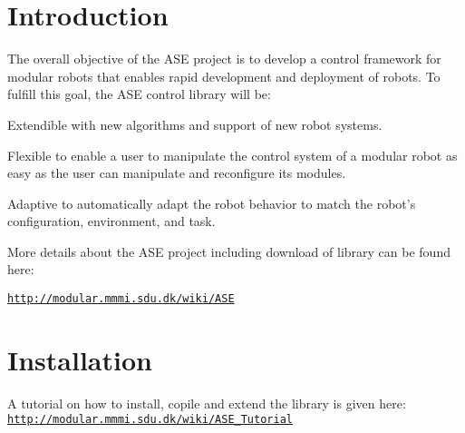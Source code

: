 \hypertarget{main_intro_sec}{}\section{Introduction}\label{main_intro_sec}
The overall objective of the ASE project is to develop a control framework for modular robots that enables rapid development and deployment of robots. To fulfill this goal, the ASE control library will be:
\begin{DoxyItemize}
\item Extendible with new algorithms and support of new robot systems.
\item Flexible to enable a user to manipulate the control system of a modular robot as easy as the user can manipulate and reconfigure its modules.
\item Adaptive to automatically adapt the robot behavior to match the robot's configuration, environment, and task.
\end{DoxyItemize}

More details about the ASE project including download of library can be found here:

\href{http://modular.mmmi.sdu.dk/wiki/ASE}{\tt http://modular.mmmi.sdu.dk/wiki/ASE}\hypertarget{main_install_sec}{}\section{Installation}\label{main_install_sec}
A tutorial on how to install, copile and extend the library is given here: \href{http://modular.mmmi.sdu.dk/wiki/ASE_Tutorial}{\tt http://modular.mmmi.sdu.dk/wiki/ASE\_\-Tutorial} 